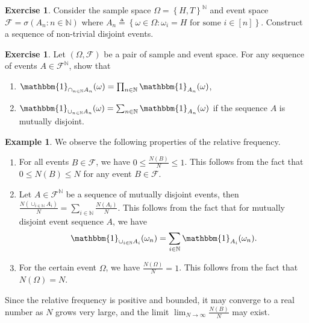 \documentclass[letterpaper,10pt,english]{article}
\theoremstyle{plain}
\theoremstyle{definition}
\newtheorem{exmp}[thm]{Example}
\newtheorem{exerc}[thm]{Exercise}
\theoremstyle{remark}
\newcommand{\EQ}[1]{\begin{equation*}#1\end{equation*}}
\newcommand{\set}[1]{\left\{#1\right\}}
\newcommand{\Ind}[1]{\mathbbm{1}_{#1}}
\newcommand{\N}{\mathbb{N}}
\newcommand{\sF}{\mathscr{F}}
\renewcommand{\le}{\leqslant}
\begin{document}
\begin{tcolorbox}
\begin{exerc}
Consider the sample space $\Omega = \set{H,T}^\N$ and event space $\sF = \sigma(A_n: n \in \N)$ where $A_n \triangleq \set{\omega \in \Omega: \omega_i = H \text{ for some } i \in [n]}$. 
Construct a sequence of non-trivial disjoint events. 
\end{exerc}
\begin{exerc}
Let $(\Omega,\sF)$ be a pair of sample and event space. 
For any sequence of events $A \in \sF^\N$, show that
\begin{enumerate}
\item $\Ind{\cap_{n\in\N}A_n}(\omega) = \prod_{n \in \N}\Ind{A_n}(\omega)$, 
\item $\Ind{\cup_{n \in \N}A_n}(\omega) = \sum_{n \in \N}\Ind{A_n}(\omega)$ if the sequence $A$ is mutually disjoint.   
\end{enumerate} 
\end{exerc}
\end{tcolorbox}
\begin{shaded}
\begin{exmp}
We observe the following properties of the relative frequency.
\begin{enumerate}
\item For all events $B \in \sF$, we have $0 \le \frac{N(B)}{N} \le 1$. 
This follows from the fact that $0 \le N(B) \le N$ for any event $B \in \sF$. 
\item Let $A\in\sF^\N$ be a sequence of mutually disjoint events,   
then $\frac{N(\cup_{i \in \N}A_i)}{N} =  \sum_{i\in \N}\frac{N(A_i)}{N}$. 
This follows from the fact that for mutually disjoint event sequence $A$, we have 
\EQ{
\Ind{\cup_{i \in \N}A_i}(\omega_n) = \sum_{i \in \N}\Ind{A_i}(\omega_n).
}
\item For the certain event $\Omega$, we have $\frac{N(\Omega)}{N} = 1$. 
This follows from the fact that $N(\Omega) = N$. 
\end{enumerate}
Since the relative frequency is positive and bounded, it may converge to a real number as $N$ grows very large, 
and the limit $\lim_{N \to \infty}\frac{N(B)}{N}$ may exist. 
\end{exmp}
\end{shaded} 
\end{document}
